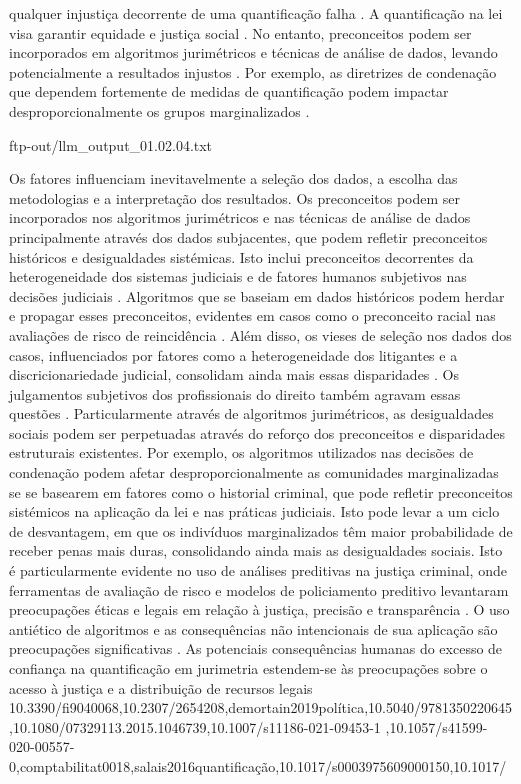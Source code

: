 qualquer injustiça decorrente de uma quantificação falha \cite{10.1590/dados.2022.65.3.267,10.1057/s41599-020-0396-5}. A quantificação na lei visa garantir equidade e justiça social \cite{101007s1102402209481w}. No entanto, preconceitos podem ser incorporados em algoritmos jurimétricos e técnicas de análise de dados, levando potencialmente a resultados injustos \cite{10.1057/s41599-020-00557-0,10.5040/9781350220645}. Por exemplo, as diretrizes de condenação que dependem fortemente de medidas de quantificação podem impactar desproporcionalmente os grupos marginalizados \cite{10.1590/dados.2022.65.3.267,10.3390/fi9040068}. 

ftp-out/llm_output_01.02.04.txt 

Os fatores influenciam inevitavelmente a seleção dos dados, a escolha das metodologias e a interpretação dos resultados. Os preconceitos podem ser incorporados nos algoritmos jurimétricos e nas técnicas de análise de dados principalmente através dos dados subjacentes, que podem refletir preconceitos históricos e desigualdades sistémicas. Isto inclui preconceitos decorrentes da heterogeneidade dos sistemas judiciais e de fatores humanos subjetivos nas decisões judiciais \cite{silva2023,ribeiro1998}. Algoritmos que se baseiam em dados históricos podem herdar e propagar esses preconceitos, evidentes em casos como o preconceito racial nas avaliações de risco de reincidência \cite{gillborn2017}. Além disso, os vieses de seleção nos dados dos casos, influenciados por fatores como a heterogeneidade dos litigantes e a discricionariedade judicial, consolidam ainda mais essas disparidades \cite{ribeiro2021,nunes2016}. Os julgamentos subjetivos dos profissionais do direito também agravam essas questões \cite{ribeiro2021}. Particularmente através de algoritmos jurimétricos, as desigualdades sociais podem ser perpetuadas através do reforço dos preconceitos e disparidades estruturais existentes. Por exemplo, os algoritmos utilizados nas decisões de condenação podem afetar desproporcionalmente as comunidades marginalizadas se se basearem em fatores como o historial criminal, que pode refletir preconceitos sistémicos na aplicação da lei e nas práticas judiciais. Isto pode levar a um ciclo de desvantagem, em que os indivíduos marginalizados têm maior probabilidade de receber penas mais duras, consolidando ainda mais as desigualdades sociais. Isto é particularmente evidente no uso de análises preditivas na justiça criminal, onde ferramentas de avaliação de risco e modelos de policiamento preditivo levantaram preocupações éticas e legais em relação à justiça, precisão e transparência \cite{10.1515/9781400829699,nayler2010}. O uso antiético de algoritmos e as consequências não intencionais de sua aplicação são preocupações significativas \cite{10.1057/s41599-020-0396-5,10.1057/s41599-020-00557-0}. As potenciais consequências humanas do excesso de confiança na quantificação em jurimetria estendem-se às preocupações sobre o acesso à justiça e a distribuição de recursos legais 10.3390/fi9040068,10.2307/2654208,demortain2019política,10.5040/9781350220645,10.1080/07329113.2015.1046739,10.1007/s11186-021-09453-1 ,10.1057/s41599-020-00557-0,comptabilitat0018,salais2016quantificação,10.1017/s0003975609000150,10.1017/ 